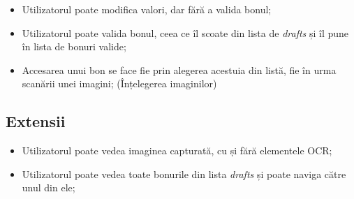 \begin{itemize}
\item
  Utilizatorul poate modifica valori, dar fără a valida bonul;
\item
  Utilizatorul poate valida bonul, ceea ce îl scoate din lista de \emph{drafts} și îl pune în lista de bonuri valide;
\item
  Accesarea unui bon se face fie prin alegerea acestuia din listă, fie în urma scanării unei imagini; (Înțelegerea imaginilor)
\end{itemize}
  
\subsection*{Extensii}

\begin{itemize}
\item
  Utilizatorul poate vedea imaginea capturată, cu și fără elementele OCR;
\item
  Utilizatorul poate vedea toate bonurile din lista \emph{drafts} și poate naviga către unul din ele;
\end{itemize}


